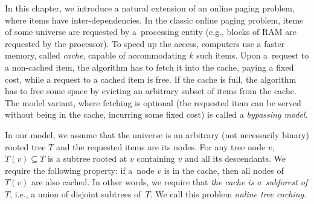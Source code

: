%

In this chapter, we introduce a natural extension of an online paging problem, where
items have inter-de\-pen\-den\-cies.
In the classic online paging problem, items of some universe are requested by
a~processing entity (e.g., blocks of RAM are requested by the processor). To
speed up the access, computers use a faster memory, called
\emph{cache}, capable of accommodating $k$ such items. Upon a~request to a
non-cached item, the algorithm has to fetch it into the cache, paying a fixed
cost, while a request to a cached item is free. If the cache is full, the
algorithm has to free some space by evicting an arbitrary subset of items from
the cache.
The model variant, where fetching is optional (the requested item can be served without being in the cache, incurring some fixed cost) is called a \emph{bypassing model}.


In our model, we assume that the universe is
an arbitrary (not necessarily binary) rooted tree $T$ and the requested items
are its nodes. For any tree node $v$, $T(v) \subseteq T$ is a subtree rooted
at $v$ containing $v$ and all its descendants. We require the following
property: if a~node $v$ is in the cache, then all nodes of $T(v)$ are also
cached. In other words, we require that \emph{the cache is a~subforest of
$T$}, i.e., a union of disjoint subtrees of~$T$.  We call this problem
\emph{online tree caching}.

